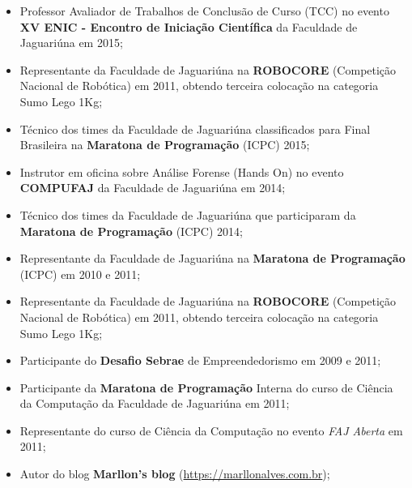 \documentclass[a4paper,10pt]{article} %
\begin{document}
\begin{itemize}
  \item Professor Avaliador de Trabalhos de Conclusão de Curso (TCC) no evento \textbf{XV ENIC - Encontro de Iniciação Científica} da Faculdade de Jaguariúna em 2015;
  \item Representante da Faculdade de Jaguariúna na \textbf{ROBOCORE} (Competição Nacional de Robótica) em 2011, obtendo terceira colocação na categoria Sumo Lego 1Kg;
  \item Técnico dos times da Faculdade de Jaguariúna classificados para Final Brasileira na \textbf{Maratona de Programação} (ICPC) 2015;  
  \item Instrutor em oficina sobre Análise Forense (Hands On) no evento \textbf{COMPUFAJ} da Faculdade de Jaguariúna em 2014;
  \item Técnico dos times da Faculdade de Jaguariúna que participaram da \textbf{Maratona de Programação} (ICPC) 2014;  
  \item Representante da Faculdade de Jaguariúna na \textbf{Maratona de Programação} (ICPC) em 2010 e 2011;  
  \item Representante da Faculdade de Jaguariúna na \textbf{ROBOCORE} (Competição Nacional de Robótica) em 2011, obtendo terceira colocação na categoria Sumo Lego 1Kg;
  \item Participante do \textbf{Desafio Sebrae} de Empreendedorismo em 2009 e 2011;
  \item Participante da \textbf{Maratona de Programação} Interna do curso de Ciência da Computação da Faculdade de Jaguariúna em 2011;
  \item Representante do curso de Ciência da Computação no evento \emph{FAJ Aberta} em 2011;
  \item Autor do blog \textbf{Marllon's blog} (\url{https://marllonalves.com.br});
  {\fb}\setmainfont[SmallCapsFont=Fontin SmallCaps]{Fontin-Regular}\\
\end{itemize}

\end{document}

